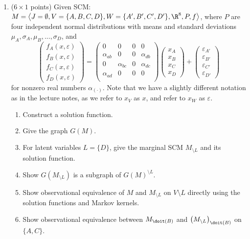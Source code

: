 \begin{enumerate}
\item ($6 \times 1$ points) Given SCM: $M = \left\langle J=\emptyset, V=\{A, B, C, D\}, W=\{A', B', C', D'\}, \R^8, P, f \right\rangle$, where $P$ are four independent normal distributions with means and standard deviations $\mu_A, \sigma_A, \mu_B, ..., \sigma_D$, and
\[
\begin{pmatrix}
	f_A(x, \varepsilon) \\ f_B(x, \varepsilon) \\ f_C(x, \varepsilon) \\ f_D(x, \varepsilon)
\end{pmatrix}
= 
\begin{pmatrix}
	0 & 0 & 0 & 0 \\
	\alpha_{ab} & 0 & 0 & \alpha_{db} \\
	0 & \alpha_{bc} & 0 & \alpha_{dc} \\
	\alpha_{ad} & 0 & 0 & 0 \\
\end{pmatrix}
\begin{pmatrix}
	x_A \\ x_B \\ x_C \\ x_D
\end{pmatrix}
+
\begin{pmatrix}
	\varepsilon_{A'} \\ \varepsilon_{B'} \\ \varepsilon_{C'} \\ \varepsilon_{D'}
\end{pmatrix}
\]
for nonzero real numbers $\alpha_{(\cdot)}$. Note that we have a slightly different notation as in the lecture notes, as we refer to $x_V$ as $x$, and refer to $x_W$ as $\varepsilon$.
\begin{enumerate}
	\item Construct a solution function. 
	\item Give the graph $G(M)$. 
	\item For latent variables $L=\{D\}$, give the marginal SCM $M_{\setminus L}$ and its solution function. 
	\item Show $G(M_{\setminus L})$ is a subgraph of $G(M)^{\setminus L}$. 
	\item Show observational equivalence of $M$ and $M_{\setminus L}$ on $V \setminus L$ directly using the solution functions and Markov kernels. 
	\item Show observational equivalence between $M_{\doit(B)}$ and ${\left(M_{\setminus L}\right)}_{\doit(B)}$ on $\{A,C\}$. 
\end{enumerate}


\end{enumerate}

